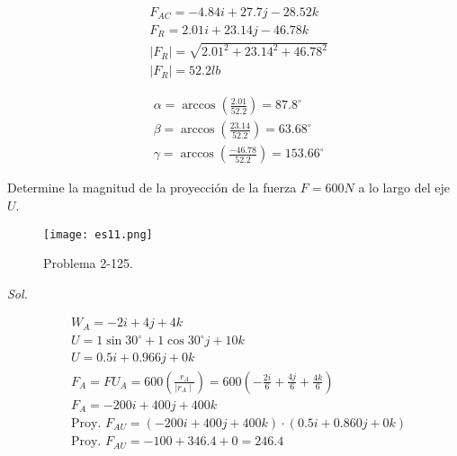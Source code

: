 \begin{align*}
	 & F_{AC}=-4.84i+27.7j-28.52k                  \\
	 & F_R=2.01i+23.14j-46.78k                     \\
	 & \mid F_R\mid =\sqrt{2.01^2+23.14^2+46.78^2} \\
	 & \mid F_R\mid =52.2lb
\end{align*}

\begin{align*}
	 & \alpha=\arccos \left( \frac{2.01}{52.2}\right)=87.8^{\circ}    \\
	 & \beta=\arccos \left(\frac{23.14}{52.2}\right)=63.68^{\circ}    \\
	 & \gamma=\arccos \left(\frac{-46.78}{52.2}\right)=153.66^{\circ}
\end{align*}


\begin{problem}
Determine la magnitud de la proyección de la fuerza $F=600N$ a lo largo del eje $U$.
\end{problem}

\begin{figure}[h!]
	\centering
	\texttt{[image: es11.png]}
	\caption{Problema 2-125.}
	\label{es11}
\end{figure}


\textit{ Sol. }

\begin{align*}
	 & W_A=-2i+4j+4k                                                                                               \\
	 & U=1\sin 30^{\circ}+1\cos 30^{\circ}j+10k                                                                    \\
	 & U=0.5i+0.966j+0k                                                                                            \\
	 & F_A=FU_A=600\left(\frac{r_A}{\mid r_A \mid}\right)=600\left(-\frac{2i}{6}+\frac{4j}{6}+\frac{4k}{6} \right) \\
	 & F_A=-200i+400j+400k                                                                                         \\
	 & \text{Proy. }F_{AU}=\left(-200i+400j+400k\right)\cdot \left( 0.5i+0.860j+0k \right)                         \\
	 & \text{Proy. }F_{AU}=-100+346.4+0=246.4
\end{align*}


